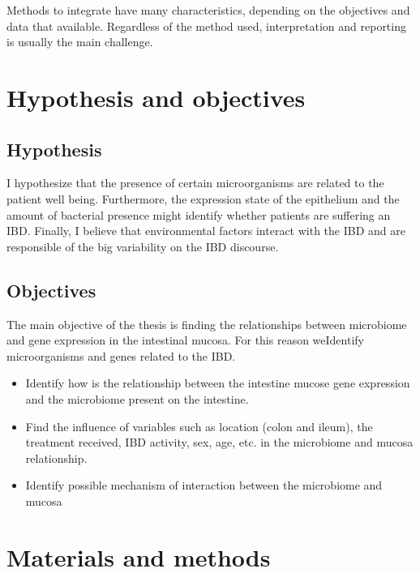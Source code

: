 \documentclass[
  a4paper,
]{book}
\begin{document}
Methods to integrate have many characteristics, depending on the objectives and data that available.
Regardless of the method used, interpretation and reporting is usually the main challenge.

\hypertarget{hypothesis-and-objectives}{%
\chapter{Hypothesis and objectives}\label{hypothesis-and-objectives}}

\hypertarget{hypothesis}{%
\section{Hypothesis}\label{hypothesis}}

I hypothesize that the presence of certain microorganisms are related to the patient well being.
Furthermore, the expression state of the epithelium and the amount of bacterial presence might identify whether patients are suffering an IBD.
Finally, I believe that environmental factors interact with the IBD and are responsible of the big variability on the IBD discourse.

\hypertarget{objectives}{%
\section{Objectives}\label{objectives}}

The main objective of the thesis is finding the relationships between microbiome and gene expression in the intestinal mucosa. For this reason weIdentify microorganisms and genes related to the IBD.

\begin{itemize}
\item
  Identify how is the relationship between the intestine mucose gene expression and the microbiome present on the intestine.
\item
  Find the influence of variables such as location (colon and ileum), the treatment received, IBD activity, sex, age, etc. in the microbiome and mucosa relationship.
\item
  Identify possible mechanism of interaction between the microbiome and mucosa
\end{itemize}

\hypertarget{materials-and-methods}{%
\chapter{Materials and methods}\label{materials-and-methods}}
\end{document}

